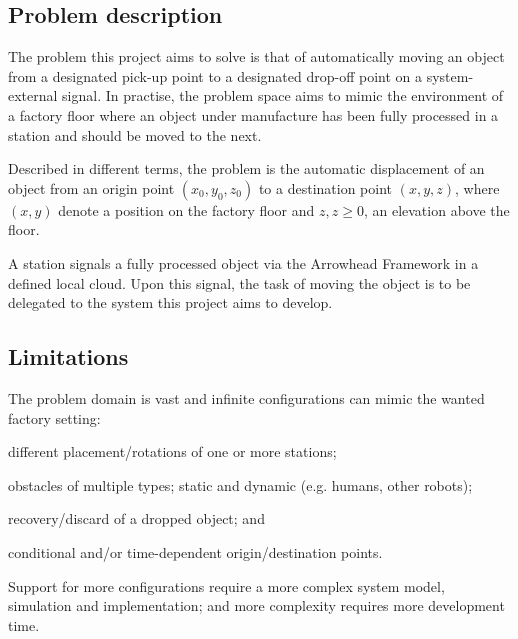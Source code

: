 \subsection{Problem description}
The problem this project aims to solve is that of automatically moving an object from a designated pick-up point to a designated drop-off point on a system-external signal.
In practise, the problem space aims to mimic the environment of a factory floor where an object under manufacture has been fully processed in a station and should be moved to the next.

Described in different terms, the problem is the automatic displacement of an object from an origin point $(x_0, y_0, z_0)$ to a destination point $(x, y, z)$,
where $(x, y)$ denote a position on the factory floor and $z, z \geq 0$, an elevation above the floor.

A station signals a fully processed object via the Arrowhead Framework in a defined local cloud.
Upon this signal, the task of moving the object is to be delegated to the system this project aims to develop.


\subsection{Limitations}
The problem domain is vast and infinite configurations can mimic the wanted factory setting:
\begin{inline-enum}
    \item different placement/rotations of one or more stations;
    \item obstacles of multiple types; static and dynamic (e.g. humans, other robots);
    \item recovery/discard of a dropped object; and
    \item conditional and/or time-dependent origin/destination points.
\end{inline-enum}
Support for more configurations require a more complex system model, simulation and implementation;
and more complexity requires more development time.

